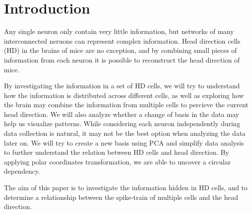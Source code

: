\section{Introduction}
Any single neuron only contain very little information, but networks of many interconnected neruons can represent complex information. Head direction cells (HD) in the brains of mice are no exception, and by combining small pieces of information from each neuron it is possible to reconstruct the head direction of mice.


By investigating the information in a set of HD cells, we will try to understand how the information is distributed across different cells, as well as exploring how the brain may combine the information from multiple cells to percieve the current head direction.
We will also analyze whether a change of basis in the data may help us visualize patterns. While considering each neuron independently during data collection is natural, it may not be the best option when analyzing the data later on. We will try to create a new basis using PCA and simplify data analysis to further understand the relation between HD cells and head direction. By applying polar coordinates transformation, we are able to uncover a circular dependency.

The aim of this paper is to investigate the information hidden in HD cells, and to determine a relationship between the spike-train of multiple cells and the head direction.

